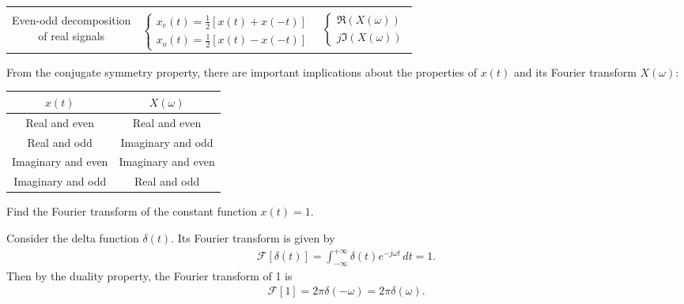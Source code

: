 \documentclass{report}
\begin{document}
\begin{table}
\begin{tabular}{|c|c|c|}
         & & \\[0.25cm]
        \shortstack{Even-odd decomposition \\ of real signals} & 
        $\begin{cases}
            x_e(t)=\frac{1}{2}[x(t)+x(-t)] \\
            x_o(t)=\frac{1}{2}[x(t)-x(-t)]
        \end{cases}$ & 
        $\begin{cases}
            \Re(X(\omega)) \\
            j\Im(X(\omega))
        \end{cases}$ \\[0.5cm]
        \hline
    \end{tabular}
\end{table}
From the conjugate symmetry property, there are important implications about the properties of $x(t)$ and its Fourier transform $X(\omega)$:
\begin{center}
    \begin{tabular}{|c|c|}
        \hline
        $x(t)$ & $X(\omega)$ \\
        \hline
        Real and even & Real and even \\
        Real and odd & Imaginary and odd \\
        Imaginary and even & Imaginary and even \\
        Imaginary and odd & Real and odd \\
        \hline
    \end{tabular}
\end{center}

\begin{example}
    Find the Fourier transform of the constant function $x(t)=1$.
\end{example}
\begin{solution}
    Consider the delta function $\delta(t)$. Its Fourier transform is given by 
    \begin{align*}
        \mathcal{F}[\delta(t)] = \int_{-\infty}^{+\infty} \delta(t) e^{-j\omega t} \,dt = 1.
    \end{align*}
    Then by the duality property, the Fourier transform of 1 is 
    \begin{align*}
        \mathcal{F}[1] = 2\pi\delta(-\omega) = 2\pi\delta(\omega).
    \end{align*}
\end{solution}
\end{document}

